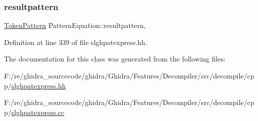 \subsubsection{\texorpdfstring{resultpattern}{resultpattern}}
{\footnotesize\ttfamily \mbox{\hyperlink{class_token_pattern}{Token\+Pattern}} Pattern\+Equation\+::resultpattern\hspace{0.3cm}{\ttfamily [mutable]}, {\ttfamily [protected]}}



Definition at line 339 of file slghpatexpress.\+hh.



The documentation for this class was generated from the following files\+:\begin{DoxyCompactItemize}
\item 
F\+:/re/ghidra\+\_\+sourcecode/ghidra/\+Ghidra/\+Features/\+Decompiler/src/decompile/cpp/\mbox{\hyperlink{slghpatexpress_8hh}{slghpatexpress.\+hh}}\item 
F\+:/re/ghidra\+\_\+sourcecode/ghidra/\+Ghidra/\+Features/\+Decompiler/src/decompile/cpp/\mbox{\hyperlink{slghpatexpress_8cc}{slghpatexpress.\+cc}}\end{DoxyCompactItemize}
